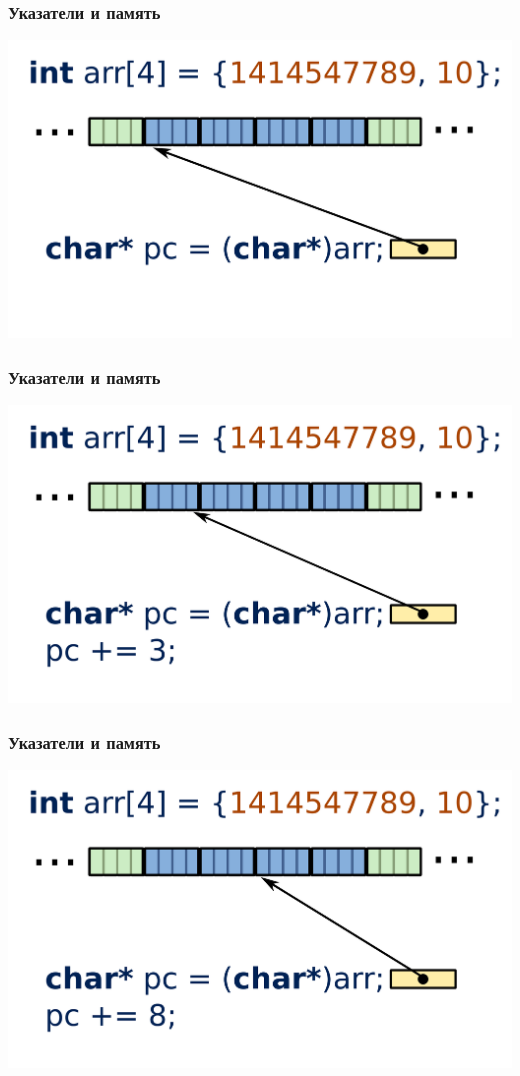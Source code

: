 \documentclass[12pt,pdf,hyperref={unicode}]{beamer}
\begin{document}
\begin{frame}[fragile]
\frametitle{Указатели и память} 
\begin{center}
\includegraphics[width=0.95\linewidth]{images/memory_different_pointers_4c.png}
\end{center}
\end{frame}

\begin{frame}[fragile]
\frametitle{Указатели и память} 
\begin{center}
\includegraphics[width=0.95\linewidth]{images/memory_different_pointers_4e.png}
\end{center}
\end{frame}

\begin{frame}[fragile]
\frametitle{Указатели и память} 
\begin{center}
\includegraphics[width=0.95\linewidth]{images/memory_different_pointers_4f.png}
\end{center}
\end{frame}
\end{document}
